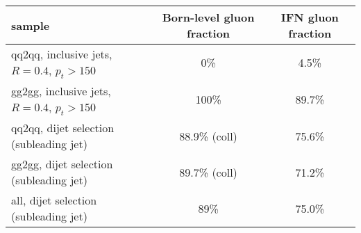 


\begin{tabular}{lcc}
  sample  & Born-level gluon fraction & IFN gluon fraction \\
  \hline
  qq2qq, inclusive jets, $R=0.4$, $p_t>150$ &   0\% &  4.5\% \\
  gg2gg, inclusive jets, $R=0.4$, $p_t>150$ & 100\% & 89.7\% \\
  \hline
  qq2qq, dijet selection (subleading jet) & 88.9\% (coll) & 75.6\% \\
  gg2gg, dijet selection (subleading jet) & 89.7\% (coll) & 71.2\% \\
  all,   dijet selection (subleading jet) & 89\% & 75.0\% \\
\end{tabular}
